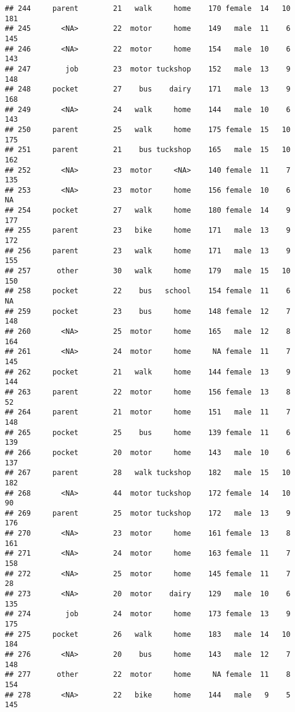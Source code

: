 \documentclass[
]{article}
\begin{document}
\begin{verbatim}
## 244     parent        21   walk     home    170 female  14   10     181
## 245       <NA>        22  motor     home    149   male  11    6     145
## 246       <NA>        22  motor     home    154   male  10    6     143
## 247        job        23  motor tuckshop    152   male  13    9     148
## 248     pocket        27    bus    dairy    171   male  13    9     168
## 249       <NA>        24   walk     home    144   male  10    6     143
## 250     parent        25   walk     home    175 female  15   10     175
## 251     parent        21    bus tuckshop    165   male  15   10     162
## 252       <NA>        23  motor     <NA>    140 female  11    7     135
## 253       <NA>        23  motor     home    156 female  10    6      NA
## 254     pocket        27   walk     home    180 female  14    9     177
## 255     parent        23   bike     home    171   male  13    9     172
## 256     parent        23   walk     home    171   male  13    9     155
## 257      other        30   walk     home    179   male  15   10     150
## 258     pocket        22    bus   school    154 female  11    6      NA
## 259     pocket        23    bus     home    148 female  12    7     148
## 260       <NA>        25  motor     home    165   male  12    8     164
## 261       <NA>        24  motor     home     NA female  11    7     145
## 262     pocket        21   walk     home    144 female  13    9     144
## 263     parent        22  motor     home    156 female  13    8      52
## 264     parent        21  motor     home    151   male  11    7     148
## 265     pocket        25    bus     home    139 female  11    6     139
## 266     pocket        20  motor     home    143   male  10    6     137
## 267     parent        28   walk tuckshop    182   male  15   10     182
## 268       <NA>        44  motor tuckshop    172 female  14   10      90
## 269     parent        25  motor tuckshop    172   male  13    9     176
## 270       <NA>        23  motor     home    161 female  13    8     161
## 271       <NA>        24  motor     home    163 female  11    7     158
## 272       <NA>        25  motor     home    145 female  11    7      28
## 273       <NA>        20  motor    dairy    129   male  10    6     135
## 274        job        24  motor     home    173 female  13    9     175
## 275     pocket        26   walk     home    183   male  14   10     184
## 276       <NA>        20    bus     home    143   male  12    7     148
## 277      other        22  motor     home     NA female  11    8     154
## 278       <NA>        22   bike     home    144   male   9    5     145

\end{verbatim}
\end{document}
